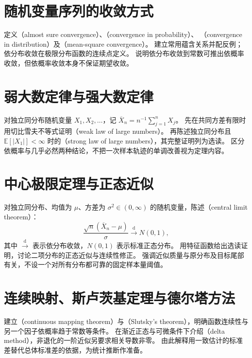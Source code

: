 \documentclass[UTF8,12pt,a4paper,fontset=fandol]{ctexbook}
\begin{document}
\section{随机变量序列的收敛方式}
\label{sec:ps-convergence-modes}
定义（almost sure convergence）、（convergence in probability）、
（convergence in distribution）及（mean-square convergence）。
建立常用蕴含关系并配反例；依分布收敛在极限分布函数的连续点定义。
说明依分布收敛到常数可推出依概率收敛，但依概率收敛本身不保证期望收敛。

\section{弱大数定律与强大数定律}
\label{sec:ps-laws-large-numbers}
对独立同分布随机变量 $X_1,X_2,\ldots$，记 $\overline X_n=n^{-1}\sum_{j=1}^nX_j$。
先在共同方差有限时用切比雪夫不等式证明（weak law of large numbers）。
再陈述独立同分布且 $\mathbb E[|X_1|]<\infty$ 时的（strong law of large numbers），其完整证明列为选读。
区分依概率与几乎必然两种结论，不把一次样本轨迹的单调改善视为定理内容。

\section{中心极限定理与正态近似}
\label{sec:ps-central-limit}
对独立同分布、均值为 $\mu$、方差为 $\sigma^2\in(0,\infty)$ 的随机变量，陈述（central limit theorem）：
\begin{equation}
  \frac{\sqrt n(\overline X_n-\mu)}{\sigma}
  \xrightarrow{\mathrm d} N(0,1),
  \label{eq:ps-clt}
\end{equation}
其中 $\xrightarrow{\mathrm d}$ 表示依分布收敛，$N(0,1)$ 表示标准正态分布。
用特征函数给出选读证明，讨论二项分布的正态近似与连续性修正。
强调近似质量与原分布及目标尾部有关，不设一个对所有分布都可靠的固定样本量阈值。

\section{连续映射、斯卢茨基定理与德尔塔方法}
\label{sec:ps-asymptotic-tools}
建立（continuous mapping theorem）与（Slutsky's theorem），明确函数连续性与另一个因子依概率趋于常数等条件。
在渐近正态与可微条件下介绍（delta method），非退化的一阶近似另要求相关导数非零。
由此解释用一致估计的标准差替代总体标准差的依据，为统计推断作准备。
\end{document}
